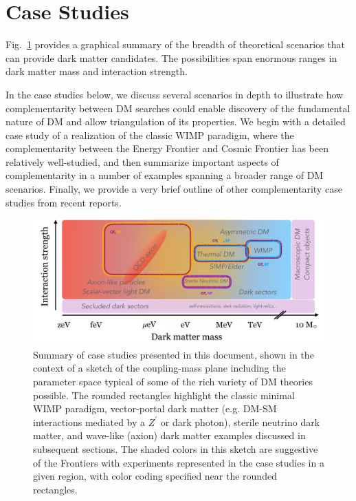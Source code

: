 \documentclass[nofootinbib]{article}
\begin{document}


\section{Case Studies}
\label{sec:CaseStudies}

Fig.~\ref{fig:allcasestudies} provides a graphical summary of the breadth of theoretical scenarios that can provide dark matter candidates. The  possibilities span enormous ranges in dark matter mass %
and interaction strength.

In the case studies below, we discuss several scenarios in depth to illustrate how complementarity between DM searches could enable discovery of the fundamental nature of DM and allow triangulation of its properties. We begin with a detailed case study of a realization of the classic WIMP paradigm, where the complementarity between the Energy Frontier and Cosmic Frontier has been relatively well-studied, and then summarize important aspects of complementarity in a number of examples spanning a broader range of DM scenarios. Finally, we provide a very brief outline of other complementarity case studies from recent reports.

\begin{figure}[htp]
\begin{center}
\includegraphics[width=\textwidth]{Figures/CouplingVsDMMassPDF.pdf}
\end{center}
    \caption{Summary of case studies presented in this document, shown in the context of a sketch of the coupling-mass plane including the parameter space typical of some of the rich variety of DM theories possible. The rounded rectangles highlight the classic minimal WIMP paradigm, vector-portal dark matter (e.g. DM-SM interactions mediated by a $Z^\prime$ or dark photon), sterile neutrino dark matter, and wave-like (axion) dark matter examples discussed in subsequent sections. The shaded colors in this sketch are suggestive of the Frontiers with experiments represented in the case studies in a given region, with color coding specified near the rounded rectangles.}
    \label{fig:allcasestudies}
\end{figure}
\end{document}
